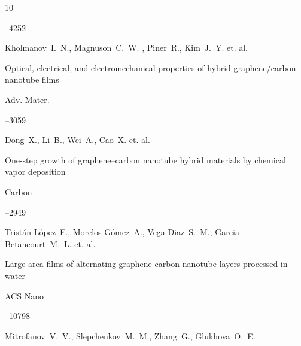 \begin{thebibliography}{10}



--4252







\by Kholmanov~I.~N., Magnuson~C.~W. , Piner~R., Kim~J.~Y. et. al.

\paper Optical, electrical, and electromechanical properties of hybrid graphene/carbon nanotube films

\jour Adv. Mater.




--3059







\by Dong~X., Li~B.,  Wei~A., Cao~X. et. al.

\paper One-step growth of graphene–carbon nanotube hybrid materials by chemical vapor deposition

\jour Carbon




--2949





\by Trist\'an-L\'opez~F., Morelos-G\'omez~A., Vega-Diaz~S.~M., Garcia-Betancourt~M.~L. et. al.

\paper Large area films of alternating graphene-carbon nanotube layers processed in water

\jour ACS Nano




--10798







\by Mitrofanov~V.~V., Slepchenkov~M.~M., Zhang~G., Glukhova~O.~E.


\end{thebibliography}
